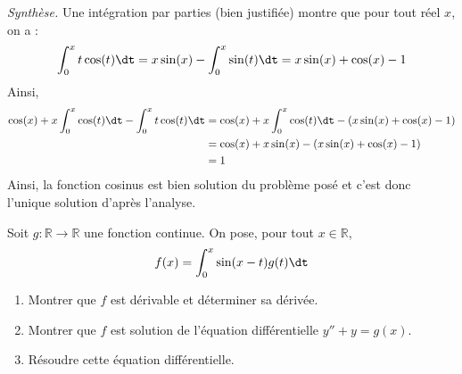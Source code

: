 \documentclass[a4paper,10pt]{report}
\begin{document}
\medskip

\noindent \textit{Synthèse.} Une intégration par parties (bien justifiée) montre que pour tout réel $x$, on a :
$$ \int_0^x t \cos(t) \dt = x \sin(x) - \int_0^x \sin(t) \dt = x \sin(x) + \cos(x) - 1 $$
Ainsi,
\begin{align*}
\cos(x) + x \int_0^x \cos(t) \dt - \int_0^x t \cos(t) \dt & =  \cos(x) + x \int_0^x \cos(t) \dt  - (x \sin(x) + \cos(x) - 1) \\
& = \cos(x) + x \sin(x)  - (x \sin(x) + \cos(x) - 1) \\
& = 1 
\end{align*}
Ainsi, la fonction cosinus est bien solution du problème posé et c'est donc l'unique solution d'après l'analyse.

\begin{Exercice}{} Soit $g : \mathbb{R} \rightarrow \mathbb{R}$ une fonction continue. On pose, pour tout $x \in \mathbb{R}$,
    \[
    f(x) = \int_0^x {\sin(x - t)g(t) \dt}
    \]
    \begin{enumerate}
      \item Montrer que $f$ est dérivable et déterminer sa dérivée.
      \item Montrer que $f$ est solution de l'équation différentielle $y'' + y = g(x)$.
      \item Résoudre cette équation différentielle.
    \end{enumerate}
\end{Exercice}
\end{document}
